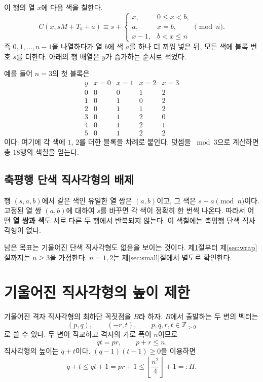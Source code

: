 \documentclass[a4paper,11pt]{article}
\theoremstyle{definition}
\begin{document}
이 행의 열 $x$에 다음 색을 칠한다.
\begin{equation}\label{eq:coloring}
 C(x,sM+T_b+a)\equiv s+
 \begin{cases}
   x,&0\le x<b,\\
   a,&x=b,\\
   x-1,&b<x\le n
 \end{cases}
 \pmod n.
\end{equation}
즉 $0,1,\ldots,n-1$을 나열하다가 열 $b$에 색 $a$를 하나 더 끼워
넣은 뒤, 모든 색에 블록 번호 $s$를 더한다.
아래의 행 배열은 $y$가 증가하는 순서로 적었다.

예를 들어 $n=3$의 첫 블록은
\[
\begin{array}{c|cccc}
 y&x=0&x=1&x=2&x=3\\ \hline
 0&0&0&1&2\\
 1&0&1&0&2\\
 2&0&1&1&2\\
 3&0&1&2&0\\
 4&0&1&2&1\\
 5&0&1&2&2
\end{array}
\]
이다. 여기에 각 색에 $1$, $2$를 더한 블록을 차례로 붙인다.
덧셈을 $\bmod 3$으로 계산하면 총 $18$행의 색칠을 얻는다.

\subsection*{축평행 단색 직사각형의 배제}

행 $(s,a,b)$에서 같은 색인 유일한 열 쌍은 $(a,b)$이고, 그 색은
$s+a\pmod n$이다. 고정된 열 쌍 $(a,b)$에 대하여 $s$를 바꾸면
각 색이 정확히 한 번씩 나온다. 따라서 어떤 \textbf{열 쌍과 색}도
서로 다른 두 행에서 반복되지 않는다.
이 색칠에는 축평행 단색 직사각형이 없다.

남은 목표는 기울어진 단색 직사각형도 없음을 보이는 것이다.
제\ref{sec:height}절부터 제\ref{sec:wrap}절까지는 $n\ge3$을 가정한다.
$n=1,2$는 제\ref{sec:small}절에서 별도로 확인한다.

\section{기울어진 직사각형의 높이 제한}\label{sec:height}

기울어진 격자 직사각형의 최하단 꼭짓점을 $B$라 하자.
$B$에서 출발하는 두 변의 벡터는
\[
  (p,q),\qquad (-r,t),\qquad p,q,r,t\in\mathbb Z_{>0}
\]
로 쓸 수 있다. 두 변이 직교하고 격자의 가로 폭이 $n$이므로
\begin{equation}\label{eq:rectangle-parameters}
  qt=pr,\qquad p+r\le n.
\end{equation}
직사각형의 높이는 $q+t$이다. $(q-1)(t-1)\ge0$을 이용하면
\begin{equation}\label{eq:height}
  q+t\le qt+1=pr+1
  \le\left\lfloor\frac{n^2}{4}\right\rfloor+1=:H.
\end{equation}
\end{document}
